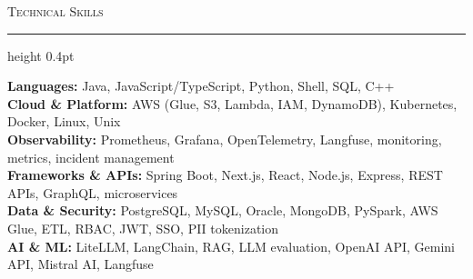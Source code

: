 \documentclass[letterpaper,11pt]{article}
\newcommand{\resumesection}[1]{%
  \par\vspace{2pt}%
  {\large\scshape #1}\par\vspace{2pt}%
  \hrule height 0.4pt\vspace{2pt}%
}
\begin{document}
\resumesection{Technical Skills}
\textbf{Languages:} Java, JavaScript/TypeScript, Python, Shell, SQL, C++\\
\textbf{Cloud \& Platform:} AWS (Glue, S3, Lambda, IAM, DynamoDB), Kubernetes, Docker, Linux, Unix\\
\textbf{Observability:} Prometheus, Grafana, OpenTelemetry, Langfuse, monitoring, metrics, incident management\\
\textbf{Frameworks \& APIs:} Spring Boot, Next.js, React, Node.js, Express, REST APIs, GraphQL, microservices\\
\textbf{Data \& Security:} PostgreSQL, MySQL, Oracle, MongoDB, PySpark, AWS Glue, ETL, RBAC, JWT, SSO, PII tokenization\\
\textbf{AI \& ML:} LiteLLM, LangChain, RAG, LLM evaluation, OpenAI API, Gemini API, Mistral AI, Langfuse
\end{document}
